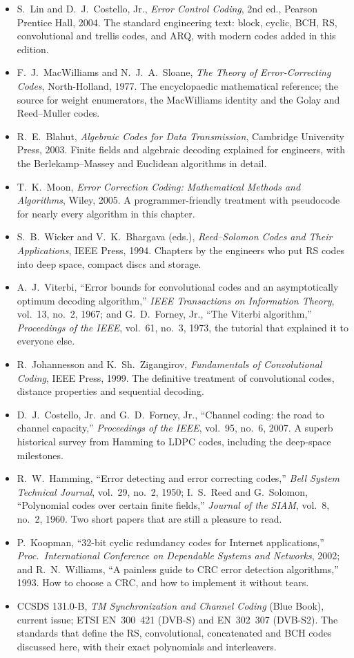 \furtherreading
\begin{itemize}
\item S.~Lin and D.~J.~Costello, Jr., \emph{Error Control Coding}, 2nd ed., Pearson Prentice Hall, 2004. The
standard engineering text: block, cyclic, BCH, RS, convolutional and trellis codes, and ARQ, with modern codes
added in this edition.
\item F.~J.~MacWilliams and N.~J.~A.~Sloane, \emph{The Theory of Error-Correcting Codes}, North-Holland, 1977.
The encyclopaedic mathematical reference; the source for weight enumerators, the MacWilliams identity and the
Golay and Reed--Muller codes.
\item R.~E.~Blahut, \emph{Algebraic Codes for Data Transmission}, Cambridge University Press, 2003. Finite
fields and algebraic decoding explained for engineers, with the Berlekamp--Massey and Euclidean algorithms in
detail.
\item T.~K.~Moon, \emph{Error Correction Coding: Mathematical Methods and Algorithms}, Wiley, 2005. A
programmer-friendly treatment with pseudocode for nearly every algorithm in this chapter.
\item S.~B.~Wicker and V.~K.~Bhargava (eds.), \emph{Reed--Solomon Codes and Their Applications}, IEEE Press,
1994. Chapters by the engineers who put RS codes into deep space, compact discs and storage.
\item A.~J.~Viterbi, ``Error bounds for convolutional codes and an asymptotically optimum decoding
algorithm,'' \emph{IEEE Transactions on Information Theory}, vol.~13, no.~2, 1967; and G.~D.~Forney, Jr.,
``The Viterbi algorithm,'' \emph{Proceedings of the IEEE}, vol.~61, no.~3, 1973, the tutorial that explained it
to everyone else.
\item R.~Johannesson and K.~Sh.~Zigangirov, \emph{Fundamentals of Convolutional Coding}, IEEE Press, 1999. The
definitive treatment of convolutional codes, distance properties and sequential decoding.
\item D.~J.~Costello, Jr.\ and G.~D.~Forney, Jr., ``Channel coding: the road to channel capacity,''
\emph{Proceedings of the IEEE}, vol.~95, no.~6, 2007. A superb historical survey from Hamming to LDPC codes,
including the deep-space milestones.
\item R.~W.~Hamming, ``Error detecting and error correcting codes,'' \emph{Bell System Technical Journal},
vol.~29, no.~2, 1950; I.~S.~Reed and G.~Solomon, ``Polynomial codes over certain finite fields,'' \emph{Journal
of the SIAM}, vol.~8, no.~2, 1960. Two short papers that are still a pleasure to read.
\item P.~Koopman, ``32-bit cyclic redundancy codes for Internet applications,'' \emph{Proc.\ International
Conference on Dependable Systems and Networks}, 2002; and R.~N.~Williams, ``A painless guide to CRC error
detection algorithms,'' 1993. How to choose a CRC, and how to implement it without tears.
\item CCSDS 131.0-B, \emph{TM Synchronization and Channel Coding} (Blue Book), current issue; ETSI EN~300~421
(DVB-S) and EN~302~307 (DVB-S2). The standards that define the RS, convolutional, concatenated and BCH codes
discussed here, with their exact polynomials and interleavers.
\end{itemize}
